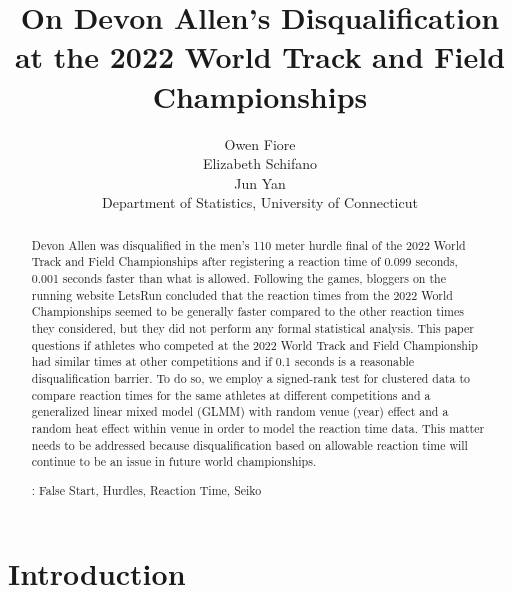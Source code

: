 \documentclass[12pt, letterpaper, titlepage]{article}
\title{On Devon Allen's Disqualification at the 2022 World Track and Field 
Championships}
\author{Owen Fiore\\
  Elizabeth Schifano\\
  Jun Yan\\[1ex]
  Department of Statistics, University of Connecticut\\
}
\date{}
\begin{document}
\maketitle

\begin{abstract}
Devon Allen was disqualified in the men's 110 meter hurdle final of the 2022
World Track and Field Championships after registering a reaction time of 0.099 
seconds, 0.001 seconds faster than what is allowed. Following the games, 
bloggers on the running website LetsRun concluded that the reaction times  
from the 2022 World Championships seemed to be generally faster compared to the 
other reaction times they considered, but they did not perform any formal 
statistical analysis. This paper questions if athletes who competed at the 2022
World Track and Field Championship had similar times at other competitions and
if 0.1 seconds is a reasonable disqualification barrier. To do so, we employ a 
signed-rank test for clustered data to compare reaction times for the same 
athletes at different competitions and a generalized linear mixed model 
(GLMM) with random venue (year) effect and a random heat effect within venue 
in order to model the reaction time data. This matter needs to be addressed 
because disqualification based on allowable reaction time will continue to be an
issue in future world championships.


\bigskip{}:
False Start, Hurdles, Reaction Time, Seiko 

\end{abstract}

\doublespace


\section{Introduction}
\label{sec:intro}
\end{document}
